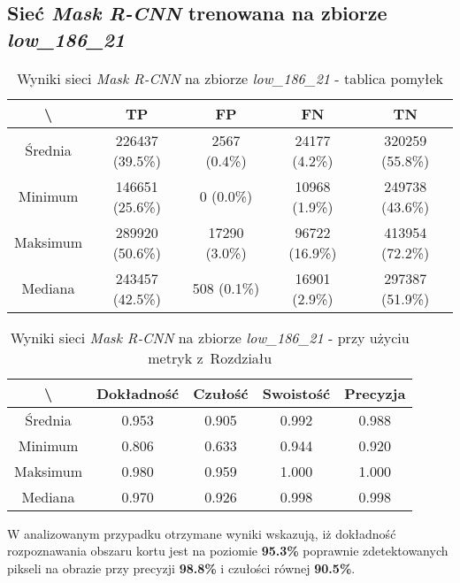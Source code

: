 \subsection{Sieć \textit{Mask R-CNN} trenowana na zbiorze \textit{low\_186\_21}}
\label{sec:results_low_original}

\begin{table}[H]
  \centering
	\caption{Wyniki sieci \textit{Mask R-CNN} na zbiorze \textit{low\_186\_21} - tablica pomyłek}
	\vspace{6pt}
	{\footnotesize
		\begin{tabular}{|c|c|c|c|c|}
      \hline \textbackslash & TP & FP & FN & TN \\
      \hline Średnia & 226437 (39.5\%) & 2567 (0.4\%) & 24177 (4.2\%) & 320259 (55.8\%) \\
      \hline Minimum & 146651 (25.6\%) & 0 (0.0\%) & 10968 (1.9\%) & 249738 (43.6\%) \\
      \hline Maksimum & 289920 (50.6\%) & 17290 (3.0\%) & 96722 (16.9\%) & 413954 (72.2\%) \\
      \hline Mediana & 243457 (42.5\%) & 508 (0.1\%) & 16901 (2.9\%) & 297387 (51.9\%) \\
      \hline
		\end{tabular}
	}
  \vspace{0pt}
  \label{Tab:low_original}
\end{table}


\begin{table}[H]
	\centering
	\caption{Wyniki sieci \textit{Mask R-CNN} na zbiorze \textit{low\_186\_21} - przy użyciu metryk z~Rozdziału }
	\vspace{6pt}
	{\footnotesize
		\begin{tabular}{|c|c|c|c|c|}
      \hline \textbackslash & Dokładność & Czułość & Swoistość & Precyzja \\
      \hline Średnia & 0.953 & 0.905 & 0.992 & 0.988 \\
      \hline Minimum & 0.806 & 0.633 & 0.944 & 0.920 \\
      \hline Maksimum & 0.980 & 0.959 & 1.000 & 1.000 \\
      \hline Mediana & 0.970 & 0.926 & 0.998 & 0.998 \\
      \hline
		\end{tabular}
	}
  \vspace{0pt}
  \label{Tab:low_original_calculated}
\end{table}

W analizowanym przypadku otrzymane wyniki wskazują, iż dokładność rozpoznawania obszaru kortu jest na poziomie \textbf{95.3\%} poprawnie zdetektowanych pikseli na obrazie przy precyzji \textbf{98.8\%} i czułości równej \textbf{90.5\%}.
